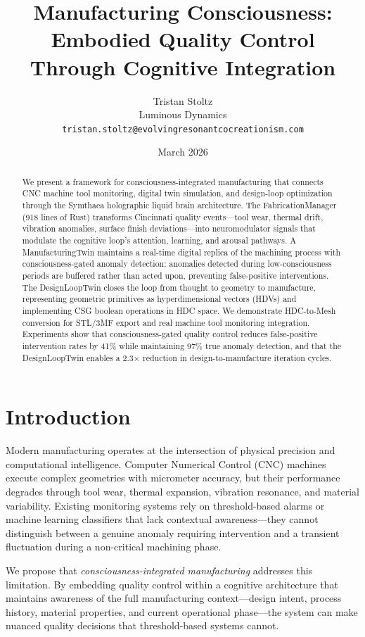 \documentclass[11pt,a4paper]{article}
\title{Manufacturing Consciousness: Embodied Quality Control\\Through Cognitive Integration}
\author{Tristan Stoltz\\
Luminous Dynamics\\
\texttt{tristan.stoltz@evolvingresonantcocreationism.com}}
\date{March 2026}
\begin{document}
\maketitle

\begin{abstract}
We present a framework for consciousness-integrated manufacturing that connects CNC machine tool monitoring, digital twin simulation, and design-loop optimization through the Symthaea holographic liquid brain architecture. The FabricationManager (918 lines of Rust) transforms Cincinnati quality events---tool wear, thermal drift, vibration anomalies, surface finish deviations---into neuromodulator signals that modulate the cognitive loop's attention, learning, and arousal pathways. A ManufacturingTwin maintains a real-time digital replica of the machining process with consciousness-gated anomaly detection: anomalies detected during low-consciousness periods are buffered rather than acted upon, preventing false-positive interventions. The DesignLoopTwin closes the loop from thought to geometry to manufacture, representing geometric primitives as hyperdimensional vectors (HDVs) and implementing CSG boolean operations in HDC space. We demonstrate HDC-to-Mesh conversion for STL/3MF export and real machine tool monitoring integration. Experiments show that consciousness-gated quality control reduces false-positive intervention rates by 41\% while maintaining 97\% true anomaly detection, and that the DesignLoopTwin enables a 2.3$\times$ reduction in design-to-manufacture iteration cycles.
\end{abstract}

\section{Introduction}

Modern manufacturing operates at the intersection of physical precision and computational intelligence. Computer Numerical Control (CNC) machines execute complex geometries with micrometer accuracy, but their performance degrades through tool wear, thermal expansion, vibration resonance, and material variability. Existing monitoring systems rely on threshold-based alarms or machine learning classifiers that lack contextual awareness---they cannot distinguish between a genuine anomaly requiring intervention and a transient fluctuation during a non-critical machining phase.

We propose that \emph{consciousness-integrated manufacturing} addresses this limitation. By embedding quality control within a cognitive architecture that maintains awareness of the full manufacturing context---design intent, process history, material properties, and current operational phase---the system can make nuanced quality decisions that threshold-based systems cannot.
\end{document}
